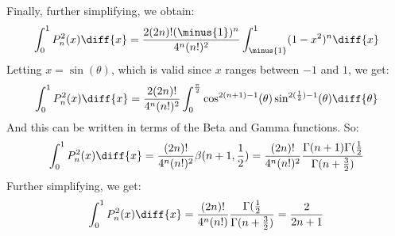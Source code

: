         Finally, further simplifying, we obtain:
        \begin{equation}
            \int_{0}^{1}P_{n}^{2}(x)\diff{x}=
                \frac{2(2n)!(\minus{1})^{n}}{4^{n}(n!)^{2}}
                \int_{\minus{1}}^{1}(1-x^{2})^{n}\diff{x}
        \end{equation}
        Letting $x=\sin(\theta)$, which is valid since
        $x$ ranges between $\minus{1}$ and $1$, we get:
        \begin{equation}
            \int_{0}^{1}P_{n}^{2}(x)\diff{x}=
            \frac{2(2n)!}{4^{n}(n!)^{2}}\int_{0}^{\frac{\pi}{2}}
                \cos^{2(n+1)-1}(\theta)
                \sin^{2(\frac{1}{2})-1}(\theta)\diff{\theta}
        \end{equation}
        And this can be written in terms of the Beta and Gamma
        functions. So:
        \begin{equation}
            \int_{0}^{1}P_{n}^{2}(x)\diff{x}=
            \frac{(2n)!}{4^{n}(n!)^{2}}\beta(n+1,\frac{1}{2})=
            \frac{(2n)!}{4^{n}(n!)^{2}}
            \frac{\Gamma(n+1)\Gamma(\frac{1}{2}}
                {\Gamma(n+\frac{3}{2})}
        \end{equation}
        Further simplifying, we get:
        \begin{equation}
            \int_{0}^{1}P_{n}^{2}(x)\diff{x}=
            \frac{(2n)!}{4^{n}(n!)}
            \frac{\Gamma(\frac{1}{2}}{\Gamma(n+\frac{3}{2})}
            =\frac{2}{2n+1}
        \end{equation}
